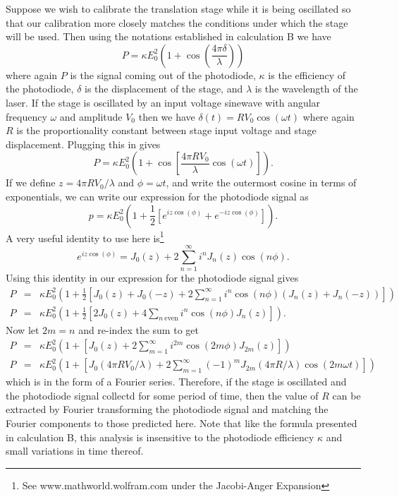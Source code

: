 \documentclass{report}
\begin{document}
Suppose we wish to calibrate the translation stage while it is being oscillated so that our calibration more closely matches the conditions under which the stage will be used.  Then using the notations established in calculation B we have
\begin{displaymath}
P = \kappa E_0^2 (1+\cos (\frac{4\pi \delta}{\lambda}))
\end{displaymath}
where again $P$ is the signal coming out of the photodiode, $\kappa$ is the efficiency of the photodiode, $\delta$ is the displacement of the stage, and $\lambda$ is the wavelength of the laser. If the stage is oscillated by an input voltage sinewave with angular frequency $\omega$ and amplitude $V_0$ then we have $\delta(t)= RV_0\cos (\omega t)$ where again $R$ is the proportionality constant between stage input voltage and stage displacement. Plugging this in gives
\begin{displaymath}
P = \kappa E_0^2 (1+\cos \left[ \frac{4\pi R V_0}{\lambda} \cos (\omega t) \right]).
\end{displaymath}
If we define $z = 4 \pi R V_0/ \lambda$ and $\phi=\omega t$, and write the outermost cosine in terms of exponentials, we can write our expression for the photodiode signal as
\begin{displaymath}
p = \kappa E_0^2 (1+\frac{1}{2}\left[ e^{iz\cos(\phi)}+e^{-iz\cos(\phi)} \right] ).
\end{displaymath}
A very useful identity to use here is\footnote{See www.mathworld.wolfram.com under the Jacobi-Anger Expansion}
\begin{displaymath}
e^{iz\cos (\phi )} = J_0(z) + 2\sum_{n=1}^{\infty} i^n J_n(z) \cos(n\phi).
\end{displaymath}
Using this identity in our expression for the photodiode signal gives
\begin{eqnarray*}
P &=& \kappa E_0^2 (1 + \frac{1}{2}\left[J_0(z)+J_0(-z)+2\sum_{n=1}^{\infty} i^n \cos(n\phi) (J_n(z)+J_n(-z)) \right ])\\
P &=& \kappa E_0^2 (1 + \frac{1}{2}\left[2J_0(z) + 4\sum_{n~\textrm{even}} i^n \cos(n\phi) J_n(z) \right ] ).
\end{eqnarray*}
Now let $2m=n$ and re-index the sum to get
\begin{eqnarray*}
P &=& \kappa E_0^2 (1 + \left[ J_0(z) + 2\sum_{m=1}^{\infty} i^{2m} \cos (2m\phi ) J_{2m}(z) \right ]) \\
P &=& \kappa E_0^2 \left(1 + \left[ J_0(4\pi RV_0/\lambda ) + 2\sum_{m=1}^{\infty} (-1)^m J_{2m}(4\pi R/\lambda ) \cos (2m \omega t) \right ] \right)
\end{eqnarray*}
which is in the form of a Fourier series. Therefore, if the stage is oscillated and the photodiode signal collectd for some period of time, then the value of $R$ can be extracted by Fourier transforming the photodiode signal and matching the Fourier components to those predicted here. Note that like the formula presented in calculation B, this analysis is insensitive to the photodiode efficiency $\kappa$ and small variations in time thereof.
\end{document}
